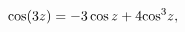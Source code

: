 \[\mathop{\cos\/}\nolimits\!\left(3z\right)=-3\mathop{\cos\/}\nolimits z+4{%
\mathop{\cos\/}\nolimits^{3}}z,\]